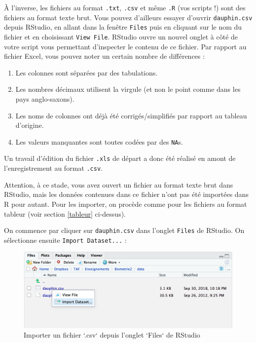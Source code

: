 \documentclass[
  a4paper,
]{article}
\providecommand{\tightlist}{%
  \setlength{\itemsep}{0pt}\setlength{\parskip}{0pt}}
\begin{document}
À l'inverse, les fichiers au format \texttt{.txt}, \texttt{.csv} et même \texttt{.R} (vos scripts !) sont des fichiers au format texte brut. Vous pouvez d'ailleurs essayer d'ouvrir \texttt{dauphin.csv} depuis RStudio, en allant dans la fenêtre \texttt{Files} puis en cliquant sur le nom du fichier et en choisissant \texttt{View\ File}. RStudio ouvre un nouvel onglet à côté de votre script vous permettant d'inspecter le contenu de ce fichier. Par rapport au fichier Excel, vous pouvez noter un certain nombre de différences :

\begin{enumerate}
\def\labelenumi{\arabic{enumi}.}
\tightlist
\item
  Les colonnes sont séparées par des tabulations.
\item
  Les nombres décimaux utilisent la virgule (et non le point comme dans les pays anglo-saxons).
\item
  Les noms de colonnes ont déjà été corrigés/simplifiés par rapport au tableau d'origine.
\item
  Les valeurs manquantes sont toutes codées par des \texttt{NA}s.
\end{enumerate}

Un travail d'édition du fichier \texttt{.xls} de départ a donc été réalisé en amont de l'enregistrement au format \texttt{.csv}.

Attention, à ce stade, vous avez ouvert un fichier au format texte brut dans RStudio, mais les données contenues dans ce fichier n'ont pas été importées dans R pour autant. Pour les importer, on procède comme pour les fichiers au format tableur (voir section \ref{tableur} ci-dessus).

On commence par cliquer sur \texttt{dauphin.csv} dans l'onglet \texttt{Files} de RStudio. On sélectionne ensuite \texttt{Import\ Dataset...} :

\begin{figure}[htpb]

{\centering \includegraphics[width=0.8\linewidth]{images/importcsv1} 

}

\caption{Importer un fichier `.csv` depuis l'onglet `Files` de RStudio}\label{fig:importcsv1}
\end{figure}
\end{document}

